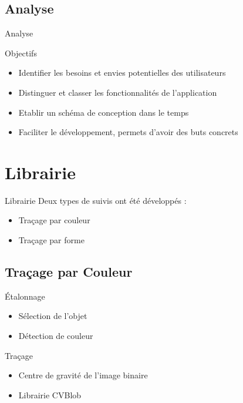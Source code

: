 \documentclass{beamer}
\begin{document}
	\subsection{Analyse}
		\begin{frame}{Analyse}
				\begin{exampleblock}{Objectifs}
				\begin{itemize}
					\item{Identifier les besoins et envies potentielles des utilisateurs}
					\item{Distinguer et classer les fonctionnalités de l'application}
					\item{Etablir un schéma de conception dans le temps}
					\item{Faciliter le développement, permets d'avoir des buts concrets}
				\end{itemize}
				\end{exampleblock}
		\end{frame}
	
	\section{Librairie}
		
		\begin{frame}{Librairie}
		Deux types de suivis ont été développés : \\
				\begin{itemize}
					\item{Traçage par couleur}
					\item{Traçage par forme}
				\end{itemize}
		\end{frame}

		\subsection{Traçage par Couleur}
		\begin{frame}{Étalonnage}
				\begin{itemize}
					\item{Sélection de l'objet}
					\item{Détection de couleur}
				\end{itemize}
		\end{frame}

		\begin{frame}{Traçage}
				\begin{itemize}
					\item{Centre de gravité de l'image binaire}
					\item{Librairie CVBlob}
				\end{itemize}
		\end{frame}
\end{document}
